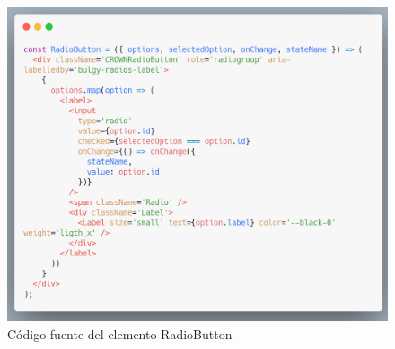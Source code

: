     \begin{figure}[H]
    \includegraphics[width=1\textwidth]{./Imagenes/8.31.png}
    \caption[Código fuente del elemento RadioButton]{Código fuente del elemento RadioButton}
    \end{figure}
  \clearpage
  
    
    
